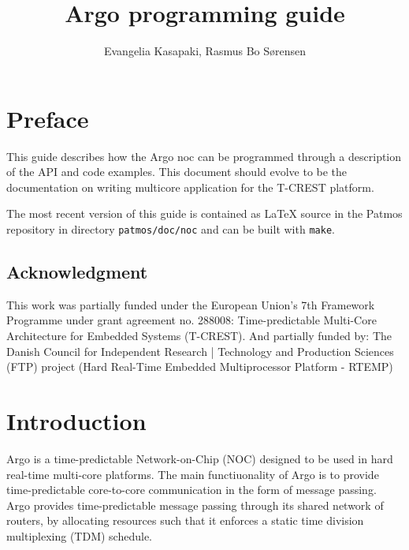 \documentclass[a4paper,fontsize=10pt,twoside,DIV15,BCOR12mm,headinclude=true,footinclude=false,pagesize,bibtotoc]{scrbook}
\newcommand{\code}[1]{{\texttt{#1}}}
\newcommand{\todo}[1]{{\emph{TODO: #1}}}
\begin{document}
\title{Argo programming guide}

\author{Evangelia Kasapaki,  Rasmus Bo S{\o}rensen}

\lowertitleback{\todo{Copyright and license terms come here.}}

\frontmatter

\maketitle

\chapter{Preface}

This guide describes how the Argo noc can be programmed through a description of the API and code examples.
This document should evolve to be the documentation on writing multicore application for the T-CREST platform.

The most recent version of this guide is contained as LaTeX source in the Patmos repository in directory
\code{patmos/doc/noc} and can be built with \code{make}.

\section*{Acknowledgment}
This work was partially funded under the
European Union's 7th Framework Programme
under grant agreement no. 288008:
Time-predictable Multi-Core Architecture for Embedded
Systems (T-CREST).
And partially funded by:
The Danish Council for Independent Research | Technology and Production Sciences (FTP) 
project (Hard Real-Time Embedded Multiprocessor Platform - RTEMP)

\tableofcontents

\begingroup
\let\cleardoublepage\clearpage
\listoffigures
\listoftables
\endgroup

\mainmatter

\chapter{Introduction}

Argo is a time-predictable Network-on-Chip (NOC) designed to be used in hard real-time multi-core platforms.
The main functiuonality of Argo is to provide time-predictable core-to-core communication in the form of message passing.
Argo provides time-predictable message passing through its shared network of routers,
by allocating resources such that it enforces a static time division multiplexing (TDM) schedule.
\end{document}
